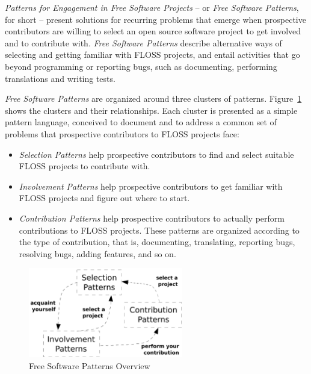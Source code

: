 \documentclass[12pt]{article}
\begin{document}
\textit{Patterns for Engagement in Free Software Projects} 
-- or \textit{Free Software Patterns},  for short -- 
present solutions for recurring problems that emerge when
prospective contributors are willing to select  an open source software project
to get involved and to contribute with.
 \textit{Free Software Patterns} describe alternative ways of
selecting and getting familiar with FLOSS projects,  
and entail activities that go beyond programming or reporting bugs,
such as documenting, performing translations and writing tests.

\textit{Free Software Patterns} are organized around three clusters of patterns.  
Figure~\ref{fig:clusters} shows the clusters and their relationships. 
Each cluster is presented as a simple pattern language, conceived to
document and to address a common set of problems that 
prospective contributors to FLOSS projects face:
\begin{itemize}
  \item
    \emph{\textit{Selection Patterns}} help prospective contributors to 
    find and select suitable FLOSS projects to contribute with.
  \item
    \emph{\textit{Involvement Patterns}} help prospective contributors to 
    get familiar with FLOSS projects and figure out where to start.
  \item
    \emph{\textit{Contribution Patterns}} help prospective contributors to
    actually perform contributions to FLOSS projects. These patterns
    are organized according to the type of contribution,
    that is, documenting, translating, reporting bugs, resolving bugs,
    adding features, and so on.
\end{itemize}

\begin{figure}[hbt]
  \begin{center}
    \includegraphics[width=0.6\textwidth]{figures/clusters}
  \end{center}
  \caption{Free Software Patterns Overview}
  \label{fig:clusters}
\end{figure}
\end{document}
